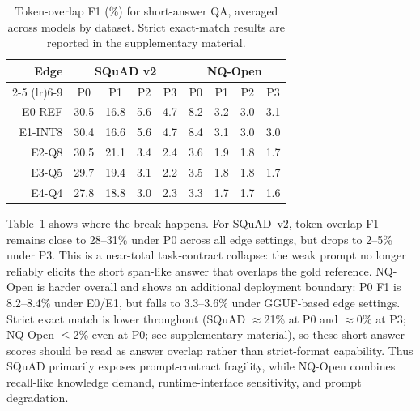 \documentclass[letterpaper]{article} %
\begin{document}
\begin{table}[t]
\centering

\setlength{\tabcolsep}{2.4pt}
\renewcommand{\arraystretch}{0.92}
\begin{tabular}{rcccc|cccc}
\toprule
Edge & \multicolumn{4}{c}{SQuAD v2} & \multicolumn{4}{c}{NQ-Open} \\
\cmidrule(lr){2-5} \cmidrule(lr){6-9}
 & P0 & P1 & P2 & P3 & P0 & P1 & P2 & P3 \\
\midrule
E0-REF & \cellcolor[HTML]{D9EAD3}30.5 & \cellcolor[HTML]{FEF2CC}16.8 & \cellcolor[HTML]{F7D5CC}5.6 & \cellcolor[HTML]{F6D3CC}4.7 & \cellcolor[HTML]{DBEAD3}8.2 & \cellcolor[HTML]{F9DECC}3.2 & \cellcolor[HTML]{F9DCCC}3.0 & \cellcolor[HTML]{F9DDCC}3.1 \\
E1-INT8 & \cellcolor[HTML]{D9EAD3}30.4 & \cellcolor[HTML]{FEF2CC}16.6 & \cellcolor[HTML]{F7D5CC}5.6 & \cellcolor[HTML]{F6D3CC}4.7 & \cellcolor[HTML]{D9EAD3}8.4 & \cellcolor[HTML]{F9DDCC}3.1 & \cellcolor[HTML]{F8DBCC}3.0 & \cellcolor[HTML]{F8DCCC}3.0 \\
E2-Q8 & \cellcolor[HTML]{D9EAD3}30.5 & \cellcolor[HTML]{F2EFCE}21.1 & \cellcolor[HTML]{F5CFCC}3.4 & \cellcolor[HTML]{F4CDCC}2.4 & \cellcolor[HTML]{FBE3CC}3.6 & \cellcolor[HTML]{F5CFCC}1.9 & \cellcolor[HTML]{F5CFCC}1.8 & \cellcolor[HTML]{F4CDCC}1.7 \\
E3-Q5 & \cellcolor[HTML]{DBEAD3}29.7 & \cellcolor[HTML]{F7F0CE}19.4 & \cellcolor[HTML]{F5CECC}3.1 & \cellcolor[HTML]{F4CCCC}2.2 & \cellcolor[HTML]{FAE2CC}3.5 & \cellcolor[HTML]{F5CECC}1.8 & \cellcolor[HTML]{F4CECC}1.8 & \cellcolor[HTML]{F4CDCC}1.7 \\
E4-Q4 & \cellcolor[HTML]{E0ECD2}27.8 & \cellcolor[HTML]{F8F1CD}18.8 & \cellcolor[HTML]{F5CECC}3.0 & \cellcolor[HTML]{F4CCCC}2.3 & \cellcolor[HTML]{F9DFCC}3.3 & \cellcolor[HTML]{F4CDCC}1.7 & \cellcolor[HTML]{F4CDCC}1.7 & \cellcolor[HTML]{F4CCCC}1.6 \\
\bottomrule
\end{tabular}%
\caption{Token-overlap F1 (\%) for short-answer QA, averaged across models by dataset. Strict exact-match results are reported in the supplementary material.}
\label{tab:short-answer-edge-prompt-em}
\end{table}


Table~\ref{tab:short-answer-edge-prompt-em} shows where the break happens. For SQuAD~v2, token-overlap F1 remains close to 28--31\% under P0 across all edge settings, but drops to 2--5\% under P3. This is a near-total task-contract collapse: the weak prompt no longer reliably elicits the short span-like answer that overlaps the gold reference. NQ-Open is harder overall and shows an additional deployment boundary: P0 F1 is 8.2--8.4\% under E0/E1, but falls to 3.3--3.6\% under GGUF-based edge settings. Strict exact match is lower throughout (SQuAD $\approx$21\% at P0 and $\approx$0\% at P3; NQ-Open $\leq$2\% even at P0; see supplementary material), so these short-answer scores should be read as answer overlap rather than strict-format capability. Thus SQuAD primarily exposes prompt-contract fragility, while NQ-Open combines recall-like knowledge demand, runtime-interface sensitivity, and prompt degradation.
\end{document}
